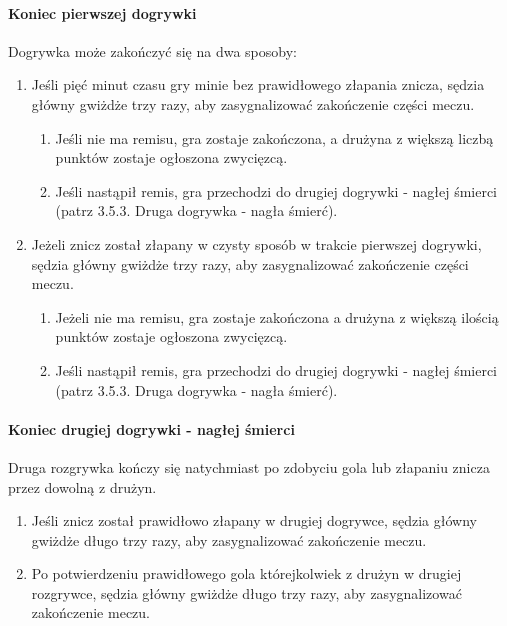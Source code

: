 \documentclass[12pt]{article}
\begin{document}
\paragraph{Koniec pierwszej dogrywki}
Dogrywka może zakończyć
się na dwa sposoby:

\begin{enumerate}
\item Jeśli pięć minut czasu gry minie bez prawidłowego złapania znicza,
sędzia główny gwiżdże trzy razy, aby zasygnalizować zakończenie części
meczu.
\begin{enumerate}
\item Jeśli nie ma remisu, gra zostaje zakończona, a drużyna z większą
liczbą punktów zostaje ogłoszona zwycięzcą.

\item Jeśli nastąpił remis, gra przechodzi do drugiej dogrywki - nagłej
śmierci (patrz 3.5.3. Druga dogrywka - nagła śmierć).
\end{enumerate}

\item Jeżeli znicz został złapany w czysty sposób w trakcie pierwszej
dogrywki, sędzia główny gwiżdże trzy razy, aby zasygnalizować
zakończenie części meczu.
\begin{enumerate}
\item Jeżeli nie ma remisu, gra zostaje zakończona a drużyna z większą
ilością punktów zostaje
ogłoszona zwycięzcą.

\item Jeśli nastąpił remis, gra przechodzi do drugiej dogrywki - nagłej
śmierci (patrz 3.5.3. Druga dogrywka - nagła śmierć).
\end{enumerate}
\end{enumerate}

\paragraph{Koniec drugiej dogrywki - nagłej śmierci}
Druga
rozgrywka kończy się natychmiast po zdobyciu gola lub złapaniu znicza
przez dowolną z drużyn.

\begin{enumerate}
\item Jeśli znicz został prawidłowo złapany w drugiej dogrywce, sędzia
główny gwiżdże długo trzy razy, aby zasygnalizować zakończenie meczu.

\item Po potwierdzeniu prawidłowego gola którejkolwiek z drużyn w drugiej
rozgrywce, sędzia główny gwiżdże długo trzy razy, aby zasygnalizować
zakończenie meczu.
\end{enumerate}
\end{document}
